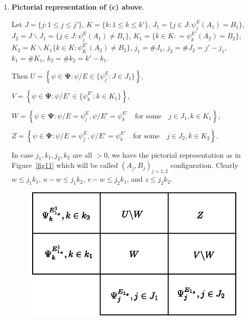 \documentclass[a4paper,12pt]{article}
\theoremstyle{definition}
\theoremstyle{underlinethm}
\theoremstyle{definition}
\begin{document}
\begin{enumerate}[label=(\alph*)]
\item \textbf{Pictorial representation of (c) above}. 

Let $J = \{j : 1 \leq j \leq j' \}$, $K = \{k : 1 \leq k \leq k'\}$, $J_{1} = \{j \in  J : \psi_{j}^{E} (A_{1}) = B_{1}\}$, $J_{2} = J \smallsetminus J_{1} = \{ j\in J : \psi_{j}^{E}(A_{1}) \neq B_{1}\}$, $K_{1} = \{k \in K : =\psi_{k}^{E'} (A_{2}) = B_{2}\}$, $K_{2} = K \smallsetminus K_{1}\{k \in K : \psi_{K}^{E'}(A_{2}) \neq B_{2}\}$, $j_{1} = \# J_{1}$, $j_{2} = \# J_{2} = j'-j_{1}$, $k_{1} = \# K_{1}$, $k_{2}= \# k_{2} = k' - k_{1}$.

Then $U = \left\{\psi\in \boldsymbol{\Psi} : \psi /E  \in \{\psi^{E}_{j} : J \in J_{1} \}\right\}$, 

$V = \left\{\psi \in \boldsymbol{\Psi} : \psi/E' \in \{\psi_{k}^{E'} : k \in K_{1} \} \right\}$,

$W = \left\{\psi \in \boldsymbol{\Psi} : \psi/E = \psi^{E}_{j}, \psi/E' = \psi^{E'}_{k} \quad \text{for some} \quad j \in J_{1}, k \in K_{1}\right\}$,

$Z = \left\{\psi \in \boldsymbol{\Psi} : \psi /E = \psi^{E}_{j}, \psi/E' = \psi^{E'}_{k} \quad \text{for some}\quad j\in J_{2}, k \in K_{2} \right\}$.


In case $j_{1}, k_{1}, j_{2}, k_{2}$ are all $> 0$, we have the pictorial representation as in Figure~\eqref{fig11} which will be called $(A_{j}, B_{j})_{j=1,2}$ configuration. Clearly $w \leq j_{1} k_{1}$, $u-w \leq j_{1}k_{2}$, $v-w \leq j_{2} k_{1}$, and $z \leq j_{2} k_{2}$. 

\begin{figure}[h]
\centering
\includegraphics[scale=1.2]{figure/figures/fig11.eps}
\caption{}\label{fig11}
\end{figure}
 

\end{enumerate}
\end{document}
